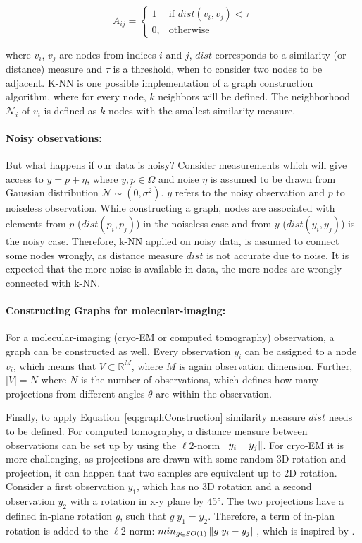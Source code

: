 \begin{equation}
    \label{eq:graphConstruction}
    A_{ij} =    
    \begin{cases}
        1  & \text{if } dist(v_i, v_j) < \tau\\
        0, & \text{otherwise}
    \end{cases}
\end{equation}

where $v_i$, $v_j$ are nodes from indices $i$ and $j$, $dist$ corresponds to a similarity (or distance) measure and $\tau$ is a threshold, 
when to consider two nodes to be adjacent.
K-NN is one possible implementation of a graph construction algorithm, 
where for every node, $k$ neighbors will be defined.
The neighborhood $\mathcal{N}_i$ of $v_i$ is defined as $k$ nodes with the smallest similarity measure.

\paragraph{Noisy observations:}
But what happens if our data is noisy?
Consider measurements which will give access to $y = p + \eta$, where $y,p \in \Omega$ and noise $\eta$ is assumed to be drawn from Gaussian distribution $\mathcal{N} \sim (0,\sigma^2)$.
$y$ refers to the noisy observation and $p$ to noiseless observation.
While constructing a graph, nodes are associated with elements from $p$ ($dist(p_i, p_j)$) in the noiseless case and from $y$ ($dist(y_i, y_j)$) is the noisy case.
Therefore, k-NN applied on noisy data, is assumed to connect some nodes wrongly, as distance measure $dist$
is not accurate due to noise. It is expected that the more noise is available in data, the more nodes are wrongly connected with k-NN.

\paragraph{Constructing Graphs for molecular-imaging:}
For a molecular-imaging (cryo-EM or computed tomography) observation, a graph can be constructed as well.
Every observation $y_i$ can be assigned to a node $v_i$, which means that $V \subset \mathbb{R}^M$, where 
$M$ is again observation dimension. 
Further, $|V|=N$ where $N$ is the number of observations, which defines how many projections from different
angles $\theta$ are within the observation.

Finally, to apply Equation~\ref{eq:graphConstruction} similarity measure $dist$ needs to be defined.
For computed tomography, a distance measure between observations can be set up by using the $\ell2$-norm $\left\lVert y_i - y_j\right\rVert$.
For cryo-EM it is more challenging, as projections are drawn with some random 3D rotation and projection, 
it can happen that two samples are equivalent up to 2D rotation. 
Consider a first observation $y_1$, which has no 3D rotation and 
a second observation $y_2$ with a rotation in x-y plane by 45°.
The two projections have a defined in-plane rotation $g$, such that $g \; y_1 = y_2$.
Therefore, a term of in-plan rotation is added to the $\ell2$-norm: $min_{g \in SO(1)}\left\lVert g \;y_i - y_j\right\rVert$, 
which is inspired by \cite{multiDiffusionMaps}. 

